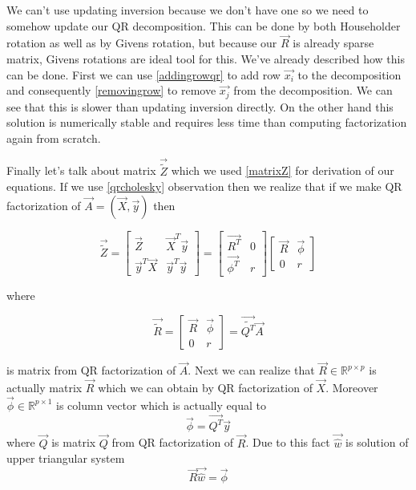 We can't use updating inversion because we don't have one so we need to somehow update our QR decomposition. This can be done by both Householder rotation as well as by Givens rotation, but because our $\vec{R}$ is already sparse matrix, Givens rotations are ideal tool for this. We've already described how this can be done. First we can use \ref{addingrowqr} to add row $\vec{x_i}$ to the decomposition and consequently \ref{removingrow} to remove $\vec{x_j}$  from the decomposition. We can see that this is slower than updating inversion directly. On the other hand this solution is numerically stable and requires less time than computing factorization again from scratch. 

Finally let's talk about matrix $\vec{\tilde{Z}}$ which we used \ref{matrixZ} for derivation of our equations. If we use \ref{qrcholesky} observation then we realize that if we make QR factorization of $\vec{A} = (\vec{X}, \vec{y})$ then

\begin{equation}
	\vec{\tilde{Z}} = 
	\begin{bmatrix}
		\vec{Z} & \vec{X}^T\vec{y} \\
    \vec{y}^T\vec{X} & \vec{y}^T\vec{y}
	\end{bmatrix} 
	= 
	\begin{bmatrix}
		\vec{R^T} & 0 \\
    \vec{\phi^T} & r
	\end{bmatrix} 
	\begin{bmatrix}
		\vec{R} & \vec{\phi} \\
     0 & r
	\end{bmatrix} 
\end{equation}

where 

\begin{equation}
	\vec{\tilde{R}} = 
	\begin{bmatrix}
		\vec{R} & \vec{\phi} \\
     0 & r
	\end{bmatrix} 
	= \vec{\tilde{Q^T}}\vec{A}
\end{equation}

is matrix from QR factorization of $\vec{A}$. 
Next we can realize that $\vec{R} \in \mathbb{R}^{p \times p}$ is actually matrix $\vec{R}$ which we can obtain by QR factorization of $\vec{X}$. 
Moreover $\vec{\phi} \in \mathbb{R}^{p \times 1}$ is column vector which is actually equal to
\begin{equation}
	\vec{\phi} =  \vec{Q^T}\vec{y}
\end{equation}
where $\vec{Q}$ is matrix $\vec{Q}$ from QR factorization of $\vec{R}$.
Due to this fact $\vec{\hat{w}}$ is solution of upper triangular system 
\begin{equation}
	\vec{R}\vec{\hat{w}} = \vec{\phi}
\end{equation}

